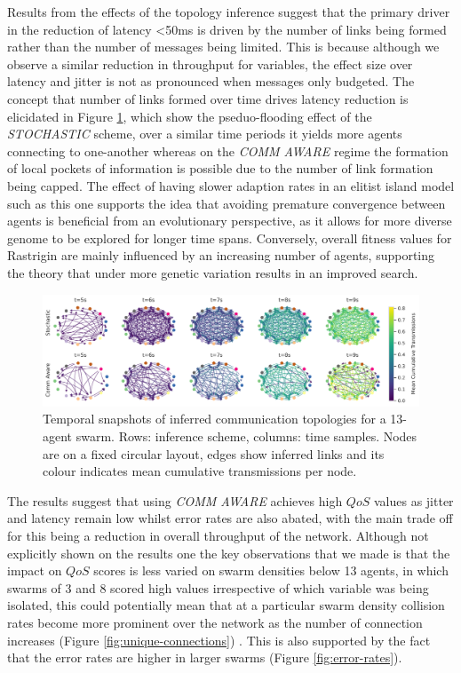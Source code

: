 \documentclass[conference]{IEEEtran}
\begin{document}
Results from the effects of the topology inference suggest that the primary driver in the reduction of latency <50ms is driven by the number of links being formed rather than the number of messages being limited. This is because although we observe a similar reduction in throughput for variables, the effect size over latency and jitter is not as pronounced when messages only budgeted. The concept that number of links formed over time drives latency reduction is elicidated in Figure \ref{fig:convergence}, which show the pseduo-flooding effect of the \emph{STOCHASTIC} scheme, over a similar time periods it yields more agents connecting to one-another whereas on the \emph{COMM AWARE} regime the formation of local pockets of information is possible due to the number of link formation being capped. The effect of having slower adaption rates in an elitist island model such as this one supports the idea that avoiding premature convergence between agents is beneficial from an evolutionary perspective, as it allows for more diverse genome to be explored for longer time spans. Conversely, overall fitness values for Rastrigin are mainly influenced by an increasing number of agents, supporting the theory that under more genetic variation results in an improved search.\\

\begin{figure}[h]
    \centering
    \includegraphics[width=1\textwidth]{convergence_impact.pdf}
    \caption{Temporal snapshots of inferred communication topologies for a 13-agent swarm. Rows: inference scheme, columns: time samples. Nodes are on a fixed circular layout, edges show inferred links and its colour indicates mean cumulative transmissions per node.}
    \label{fig:convergence}
\end{figure}

The results suggest that using \emph{COMM AWARE} achieves high $QoS$ values as jitter and latency remain low whilst error rates are also abated, with the main trade off for this being a reduction in overall throughput of the network. Although not explicitly shown on the results one the key observations that we made is that the impact on $QoS$ scores is less varied on swarm densities below 13 agents, in which swarms of 3 and 8 scored high values irrespective of which variable was being isolated, this could potentially mean that at a particular swarm density collision rates become more prominent over the network as the number of connection increases (Figure \ref{fig:unique-connections}) . This is also supported by the fact that the error rates are higher in larger swarms (Figure \ref{fig:error-rates}).\\
\end{document}
